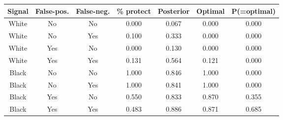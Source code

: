 \begin{table}[H]\centering \scriptsize \begin{tabular}{ccccccc} \hline \hline
\textbf{Signal}&\textbf{False-pos.}&\textbf{False-neg.}&\textbf{\% protect}& \textbf{Posterior} & \textbf{Optimal} & \textbf{P(=optimal)} \\ \hline
White&No&No&0.000&0.067&0.000&0.000\\
White&No&Yes&0.100&0.333&0.000&0.000\\
White&Yes&No&0.000&0.130&0.000&0.000\\
White&Yes&Yes&0.131&0.564&0.121&0.000\\
Black&No&No&1.000&0.846&1.000&0.000\\
Black&No&Yes&1.000&0.841&1.000&0.000\\
Black&Yes&No&0.550&0.833&0.870&0.355\\
Black&Yes&Yes&0.483&0.886&0.871&0.685\\
\hline \end{tabular} \end{table}
